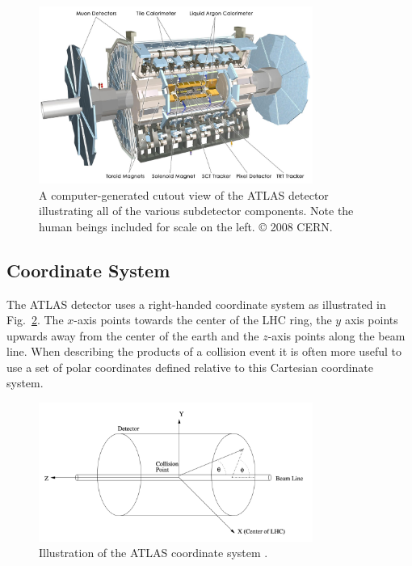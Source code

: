 \begin{figure}
	\centering
	\includegraphics[width=0.8\textwidth]{entire_detector}
	\caption{
	A computer-generated cutout view of the ATLAS detector illustrating all of the various subdetector components.
	Note the human beings included for scale on the left.
	© 2008 CERN.
	}
	\label{fig:atlas_detector_overview}
\end{figure}

\subsection{Coordinate System}
The ATLAS detector uses a right-handed coordinate system as illustrated in Fig.~\ref{fig:atlas_coordinate_system}.
The $x$-axis points towards the center of the LHC ring, the $y$ axis points upwards away from the center of the earth and the $z$-axis points along the beam line.
When describing the products of a collision event it is often more useful to use a set of polar coordinates defined relative to  this Cartesian coordinate system.

\begin{figure}
	\centering
	\includegraphics[width=0.8\textwidth]{atlas_coordinate_system}
	\caption{ Illustration of the ATLAS coordinate system \cite{Schott_2014}. }
	\label{fig:atlas_coordinate_system}
\end{figure}

